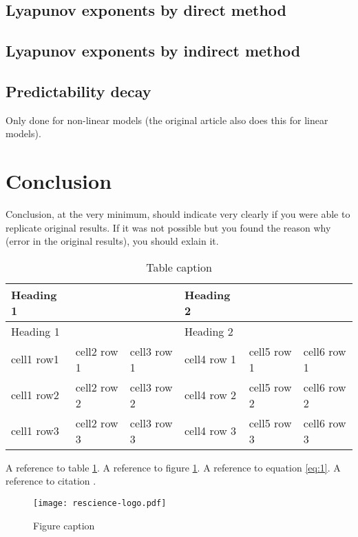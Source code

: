 \documentclass[10pt,a4paper,onecolumn]{article}
\renewcommand{\includegraphics}[2][]{\OldIncludegraphics[width=12cm, #1]{#2}}
\begin{document}
\subsection{Lyapunov exponents by direct
method}\label{lyapunov-exponents-by-direct-method}

\subsection{Lyapunov exponents by indirect
method}\label{lyapunov-exponents-by-indirect-method}

\subsection{Predictability decay}\label{predictability-decay}

Only done for non-linear models (the original article also does this for
linear models).

\section{Conclusion}\label{conclusion}

Conclusion, at the very minimum, should indicate very clearly if you
were able to replicate original results. If it was not possible but you
found the reason why (error in the original results), you should exlain
it.

\begin{longtable}[c]{@{}llllll@{}}
\caption{\label{tbl:table}Table caption }\tabularnewline
\toprule
Heading 1 & & & Heading 2 & &\tabularnewline
\midrule
\endfirsthead
\toprule
Heading 1 & & & Heading 2 & &\tabularnewline
\midrule
\endhead
cell1 row1 & cell2 row 1 & cell3 row 1 & cell4 row 1 & cell5 row 1 &
cell6 row 1\tabularnewline
cell1 row2 & cell2 row 2 & cell3 row 2 & cell4 row 2 & cell5 row 2 &
cell6 row 2\tabularnewline
cell1 row3 & cell2 row 3 & cell3 row 3 & cell4 row 3 & cell5 row 3 &
cell6 row 3\tabularnewline
\bottomrule
\end{longtable}

A reference to table \ref{tbl:table}. A reference to figure
\ref{fig:logo}. A reference to equation \ref{eq:1}. A reference to
citation \textcite{markdown}.

\begin{figure}[htbp]
\centering
\texttt{[image: rescience-logo.pdf]}
\caption{\label{fig:logo}Figure caption}
\end{figure}
\end{document}
